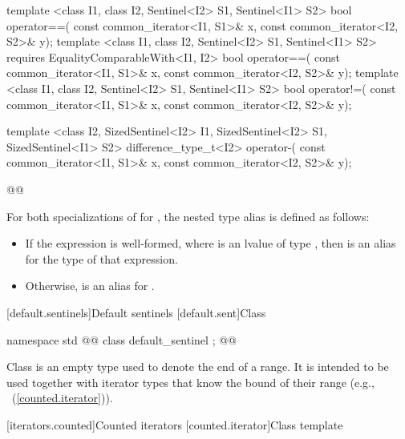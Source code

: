 \begin{codeblock}
{  template <class I1, class I2, Sentinel<I2> S1, Sentinel<I1> S2>
  bool operator==(
    const common_iterator<I1, S1>& x, const common_iterator<I2, S2>& y);
  template <class I1, class I2, Sentinel<I2> S1, Sentinel<I1> S2>
    requires EqualityComparableWith<I1, I2>
  bool operator==(
    const common_iterator<I1, S1>& x, const common_iterator<I2, S2>& y);
  template <class I1, class I2, Sentinel<I2> S1, Sentinel<I1> S2>
  bool operator!=(
    const common_iterator<I1, S1>& x, const common_iterator<I2, S2>& y);

  template <class I2, SizedSentinel<I2> I1, SizedSentinel<I2> S1, SizedSentinel<I1> S2>
  difference_type_t<I2> operator-(
    const common_iterator<I1, S1>& x, const common_iterator<I2, S2>& y);
}@\removed{\}}@
\end{codeblock}

\begin{addedblock}
\pnum
For both specializations of  for
, the nested  type alias is defined
as follows:
\begin{itemize}
\item If the expression  is well-formed, where 
is an lvalue of type , then
 is an alias for the type of that expression.
\item Otherwise,  is an alias for .
\end{itemize}
\end{addedblock}

[default.sentinels]{Default sentinels}
[default.sent]{Class }

%
\begin{itemdecl}
namespace std { @@
  class default_sentinel { };
}@\removed{\}}@
\end{itemdecl}

\pnum
Class  is an empty type used to denote the end of a
range. It is intended to be used together with iterator types that know the bound
of their range (e.g., ~(\ref{counted.iterator})).

[iterators.counted]{Counted iterators}
[counted.iterator]{Class template }


